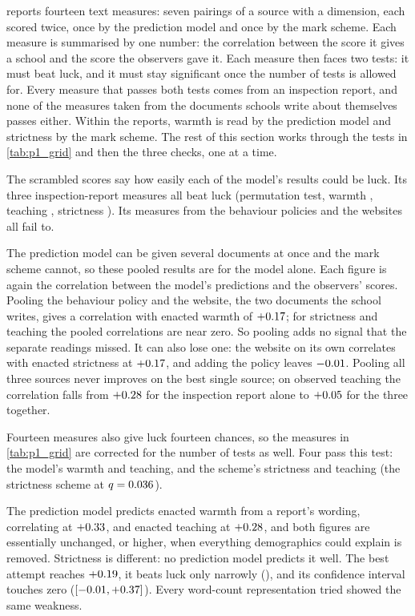  reports fourteen text measures: seven pairings of a source with a dimension, each scored twice, once by the prediction model and once by the mark scheme. Each measure is summarised by one number: the correlation between the score it gives a school and the score the observers gave it. Each measure then faces two tests: it must beat luck, and it must stay significant once the number of tests is allowed for. Every measure that passes both tests comes from an inspection report, and none of the measures taken from the documents schools write about themselves passes either. Within the reports, warmth is read by the prediction model and strictness by the mark scheme. The rest of this section works through the tests in \cref{tab:p1_grid} and then the three checks, one at a time.



The scrambled scores say how easily each of the model's results could be luck. Its three inspection-report measures all beat luck (permutation test, warmth \PermPOfstedW{}, teaching \PermPOfstedT{}, strictness \PermPOfstedS{}). Its measures from the behaviour policies and the websites all fail to.

The prediction model can be given several documents at once and the mark scheme cannot, so these pooled results are for the model alone. Each figure is again the correlation between the model's predictions and the observers' scores. Pooling the behaviour policy and the website, the two documents the school writes, gives a correlation with enacted warmth of $+0.17$; for strictness and teaching the pooled correlations are near zero. So pooling adds no signal that the separate readings missed. It can also lose one: the website on its own correlates with enacted strictness at $+0.17$, and adding the policy leaves $-0.01$. Pooling all three sources never improves on the best single source; on observed teaching the correlation falls from $+0.28$ for the inspection report alone to $+0.05$ for the three together.

Fourteen measures also give luck fourteen chances, so the measures in \cref{tab:p1_grid} are corrected for the number of tests as well. Four pass this test: the model's warmth and teaching, and the scheme's
strictness and teaching (the strictness scheme at $q = 0.036$).

The prediction model predicts enacted warmth from a report's wording, correlating at $+0.33$, and enacted teaching at $+0.28$, and both figures
are essentially unchanged, or higher, when everything demographics could explain is removed.
Strictness is different: no prediction model predicts it well. The best attempt reaches
$+0.19$, it beats luck only narrowly (\PermPOfstedS{}), and its confidence interval
touches zero ($[-0.01, +0.37]$). Every word-count representation tried showed the same weakness.

